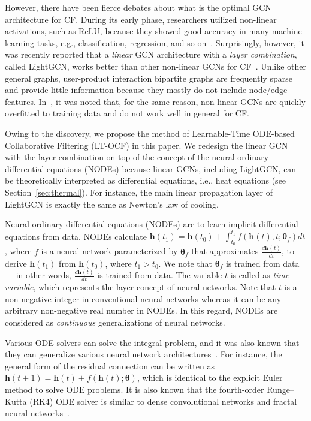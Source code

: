 \documentclass[sigconf]{acmart}
\begin{document}
However, there have been fierce debates about what is the optimal GCN architecture for CF. During its early phase, researchers utilized non-linear activations, such as ReLU, because they showed good accuracy in many machine learning tasks, e.g., classification, regression, and so on~\cite{DBLP:journals/corr/BergKW17,DBLP:conf/kdd/YingHCEHL18,DBLP:conf/mm/WeiWN0HC19,DBLP:conf/www/WangZXLG19,10.1145/3331184.3331267}. Surprisingly, however, it was recently reported that a \emph{linear} GCN architecture with a \emph{layer combination}, called LightGCN, works better than other non-linear GCNs for CF~\cite{10.1145/3331184.3331267,Chen_Wu_Hong_Zhang_Wang_2020,10.1145/3397271.3401063}. Unlike other general graphs, user-product interaction bipartite graphs are frequently sparse and provide little information because they mostly do not include node/edge features. In~\cite{10.1145/3397271.3401063}, it was noted that, for the same reason, non-linear GCNs are quickly overfitted to training data and do not work well in general for CF.

Owing to the discovery, we propose the method of Learnable-Time ODE-based Collaborative Filtering (LT-OCF) in this paper. We redesign the linear GCN with the layer combination on top of the concept of the neural ordinary differential equations (NODEs) because linear GCNs, including LightGCN, can be theoretically interpreted as differential equations, i.e., heat equations (see Section~\ref{sec:thermal}). For instance, the main linear propagation layer of LightGCN is exactly the same as Newton's law of cooling.

Neural ordinary differential equations (NODEs) are to learn implicit differential equations from data. NODEs calculate $\bm{h}(t_1) = \bm{h}(t_0) + \int_{t_0}^{t_1}f(\bm{h}(t),t;\bm{\theta}_f)dt$, where $f$ is a neural network parameterized by $\bm{\theta}_f$ that approximates $\frac{d\bm{h}(t)}{dt}$, to derive $\bm{h}(t_1)$ from $\bm{h}(t_0)$, where $t_1 > t_0$. We note that $\bm{\theta}_f$ is trained from data --- in other words, $\frac{d\bm{h}(t)}{dt}$ is trained from data. The variable $t$ is called as \emph{time variable}, which represents the layer concept of neural networks. Note that $t$ is a non-negative integer in conventional neural networks whereas it can be any arbitrary non-negative real number in NODEs. In this regard, NODEs are considered as \emph{continuous} generalizations of neural networks.

Various ODE solvers can solve the integral problem, and it was also known that they can generalize various neural network architectures~\cite{NIPS2018_7892}. For instance, the general form of the residual connection can be written as $\bm{h}(t+1) = \bm{h}(t) + f(\bm{h}(t);\bm{\theta})$, which is identical to the explicit Euler method to solve ODE problems. It is also known that the fourth-order Runge--Kutta (RK4) ODE solver is similar to dense convolutional networks and fractal neural networks~\cite{pmlr-v80-lu18d}.
\end{document}
